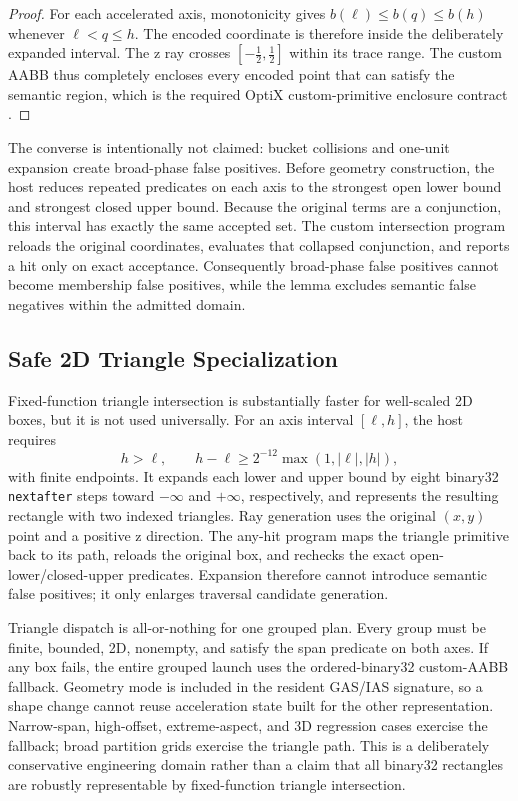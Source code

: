 \documentclass[11pt]{article}
\begin{document}
\begin{proof}
For each accelerated axis, monotonicity gives
$b(\ell)\le b(q)\le b(h)$ whenever $\ell<q\le h$. The encoded coordinate is
therefore inside the deliberately expanded interval. The z ray crosses
$[-\tfrac12,\tfrac12]$ within its trace range. The custom AABB thus completely
encloses every encoded point that can satisfy the semantic region, which is the
required OptiX custom-primitive enclosure contract \cite{nvidiaoptix9}.
\qedhere
\end{proof}

The converse is intentionally not claimed: bucket collisions and one-unit
expansion create broad-phase false positives. Before geometry construction, the
host reduces repeated predicates on each axis to the strongest open lower bound
and strongest closed upper bound. Because the original terms are a conjunction,
this interval has exactly the same accepted set. The custom intersection program
reloads the original coordinates, evaluates that collapsed conjunction, and
reports a hit only on exact acceptance. Consequently broad-phase false
positives cannot become membership false positives, while the lemma excludes
semantic false negatives within the admitted domain.

\subsection{Safe 2D Triangle Specialization}

Fixed-function triangle intersection is substantially faster for well-scaled
2D boxes, but it is not used universally. For an axis interval $[\ell,h]$, the
host requires
\[
  h>\ell,\qquad
  h-\ell \ge 2^{-12}\max(1,|\ell|,|h|),
\]
with finite endpoints. It expands each lower and upper bound by eight binary32
\texttt{nextafter} steps toward $-\infty$ and $+\infty$, respectively, and
represents the resulting rectangle with two indexed triangles. Ray generation
uses the original $(x,y)$ point and a positive z direction. The any-hit program
maps the triangle primitive back to its path, reloads the original box, and
rechecks the exact open-lower/closed-upper predicates. Expansion therefore
cannot introduce semantic false positives; it only enlarges traversal candidate
generation.

Triangle dispatch is all-or-nothing for one grouped plan. Every group must be
finite, bounded, 2D, nonempty, and satisfy the span predicate on both axes. If
any box fails, the entire grouped launch uses the ordered-binary32 custom-AABB
fallback. Geometry mode is included in the resident GAS/IAS signature, so a
shape change cannot reuse acceleration state built for the other
representation. Narrow-span, high-offset, extreme-aspect, and 3D regression
cases exercise the fallback; broad partition grids exercise the triangle path.
This is a deliberately conservative engineering domain rather than a claim that
all binary32 rectangles are robustly representable by fixed-function triangle
intersection.
\end{document}
